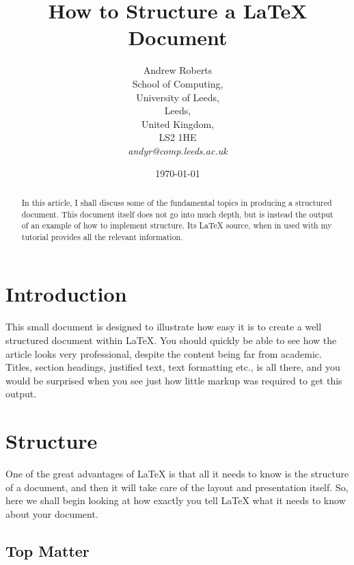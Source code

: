 \documentclass{article}  %
\begin{document}
\title{How to Structure a \LaTeX{} Document}
\author{Andrew Roberts\\
  School of Computing,\\
  University of Leeds,\\
  Leeds,\\
  United Kingdom,\\
  LS2 1HE\\
  \emph{andyr@comp.leeds.ac.uk}}
\date{\today}
\maketitle

\begin{abstract} 
  In this article, I shall discuss some of the fundamental
  topics in producing a structured document.  This document
  itself does not go into much depth, but is instead the
  output of an example of how to implement structure. Its
  \LaTeX{} source, when in used with my tutorial provides
  all the relevant information.
\end{abstract}

\section{Introduction}
\label{sec:introduction}

This small document is designed to illustrate how easy it is to create a well structured
document within \LaTeX\cite{lamport94}.  You should quickly be able to see how the article
looks very professional, despite the content being far from academic.  Titles, section
headings, justified text, text formatting etc., is all there, and you would be surprised
when you see just how little markup was required to get this output.

\section{Structure}
\label{sec:structure}

One of the great advantages of \LaTeX{} is that all it needs to know is
the structure of a document, and then it will take care of the layout
and presentation itself.  So, here we shall begin looking at how exactly
you tell \LaTeX{} what it needs to know about your document.

\subsection{Top Matter}
\label{sec:top-matter}
\end{document}
